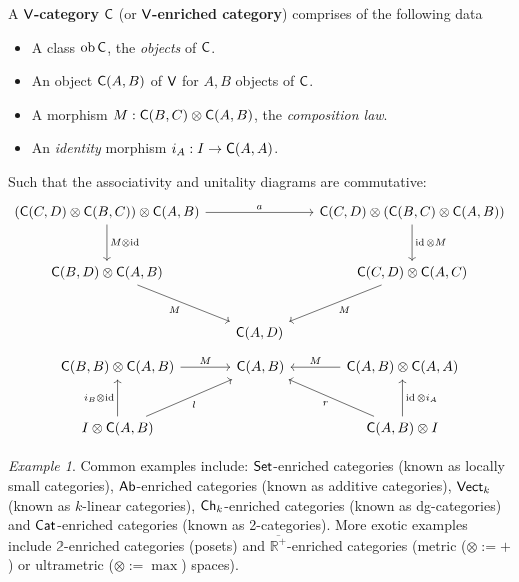\documentclass[10pt,a4paper]{article}
\newcommand{\bb}[1]{\mathbb{#1}}
\newcommand{\cat}[1]{\textcat{#1}}
\newcommand{\textcat}[1]{{\normalfont\textsf{#1}}}
\DeclareMathOperator{\id}{id}
\DeclareMathOperator{\ob}{ob}
\theoremstyle{plain}
\theoremstyle{definition}
\theoremstyle{remark}
\newtheorem{example}[theorem]{Example}
\begin{document}
\begin{definition}
    \index{category!$\cat{V}$-enriched}
    A \textbf{$\cat{V}$-category} $\cat{C}$ (or \textbf{$\cat{V}$-enriched category}) comprises of the following data
    \begin{itemize}
        \item A class $\ob\cat{C}$, the \textit{objects} of $\cat{C}$.
        \item An object $\cat{C}(A, B)$ of $\cat{V}$ for $A, B$ objects of $\cat{C}$.
        \item A morphism $M : \cat{C}(B, C) \otimes \cat{C}(A, B)$, the \textit{composition law}.
        \item An \textit{identity} morphism $i_A : I \to \cat{C}(A, A)$.
    \end{itemize}
    Such that the associativity and unitality diagrams are commutative:
    \[\begin{tikzcd}[sep=scriptsize]
        {(\cat{C}(C, D) \otimes \cat{C}(B, C)) \otimes \cat{C}(A, B)} && {\cat{C}(C, D) \otimes (\cat{C}(B, C) \otimes \cat{C}(A, B))} \\
        \\
        {\cat{C}(B, D)\otimes \cat{C}(A, B)} && {\cat{C}(C, D) \otimes \cat{C}(A, C)} \\
        \\
        & {\cat{C}(A, D)}
        \arrow["a", from=1-1, to=1-3]
        \arrow["{M\otimes \id}", from=1-1, to=3-1]
        \arrow["{\id \otimes M}", from=1-3, to=3-3]
        \arrow["M"', from=3-1, to=5-2]
        \arrow["M", from=3-3, to=5-2]
    \end{tikzcd}\]
    \[\begin{tikzcd}[sep=scriptsize]
        {\cat{C}(B, B) \otimes \cat{C}(A, B)} && {\cat{C}(A, B)} && {\cat{C}(A, B) \otimes \cat{C}(A, A)} \\
        \\
        {I \otimes \cat{C}(A, B)} &&&& {\cat{C}(A, B) \otimes I}
        \arrow["M", from=1-1, to=1-3]
        \arrow["M"', from=1-5, to=1-3]
        \arrow["{i_B \otimes \id}", from=3-1, to=1-1]
        \arrow["l"', from=3-1, to=1-3]
        \arrow["r", from=3-5, to=1-3]
        \arrow["{\id \otimes i_A}"', from=3-5, to=1-5]
    \end{tikzcd}\]
\end{definition}

\begin{example}
    Common examples include: $\cat{Set}$-enriched categories (known as locally small categories), $\cat{Ab}$-enriched categories (known as additive categories), $\cat{Vect}_k$ (known as $k$-linear categories), $\cat{Ch}_k$-enriched categories (known as dg-categories) and $\cat{Cat}$-enriched categories (known as 2-categories). More exotic examples include $\bb 2$-enriched categories (posets) and $\overline{\bb{R}^+}$-enriched categories (metric ($\otimes := +$) or ultrametric ($\otimes := \max$) spaces).
\end{example}
\end{document}
